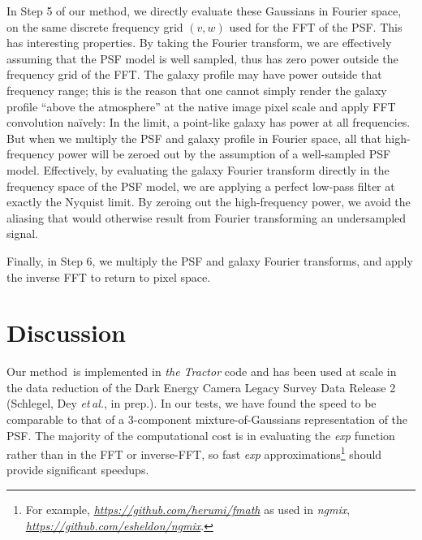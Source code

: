 \documentclass[11pt,preprint]{aastex}
\newcommand{\foreign}[1]{\emph{#1}}
\newcommand{\etal}{\foreign{et\,al.}}
\newcommand{\niceurl}[1]{\href{#1}{\textsl{#1}}}
\newcommand{\project}[1]{\textsl{#1}}
\newcommand{\trick}{method}
\begin{document}


In Step 5 of our \trick, we directly evaluate these Gaussians in Fourier
space, on the same discrete frequency grid $(v, w)$ used for the FFT
of the PSF.  This has interesting properties.  By taking the Fourier
transform, we are effectively assuming that the PSF model is well
sampled, thus has zero power outside the frequency grid of the FFT.
The galaxy profile may have power outside that frequency range; this
is the reason that one cannot simply render the galaxy profile ``above
the atmosphere'' at the native image pixel scale and apply FFT
convolution na\"ively: In the limit, a point-like galaxy has power at
all frequencies.  But when we multiply the PSF and galaxy profile in
Fourier space, all that high-frequency power will be zeroed out by the
assumption of a well-sampled PSF model.  Effectively, by evaluating the
galaxy Fourier transform directly in the frequency space of the PSF
model, we are applying a perfect low-pass filter at exactly the
Nyquist limit.  By zeroing out the high-frequency power, we avoid the
aliasing that would otherwise result from Fourier transforming an
undersampled signal.
%

Finally, in Step 6, we multiply the PSF and galaxy Fourier transforms,
and apply the inverse FFT to return to pixel space.

\section{Discussion}

Our \trick\ is implemented in \project{the Tractor} code and has been
used at scale in the data reduction of the Dark Energy Camera Legacy
Survey Data Release 2 (Schlegel, Dey \etal, in prep.).  In our tests, we
have found the speed to be comparable to that of a 3-component
mixture-of-Gaussians representation of the PSF.  The majority of the
computational cost is in evaluating the \emph{exp} function rather
than in the FFT or inverse-FFT, so fast \emph{exp} approximations\footnote{%
For example, \niceurl{https://github.com/herumi/fmath} as used in
\project{ngmix}, \niceurl{https://github.com/esheldon/ngmix}.}
should provide significant speedups.

\end{document}
